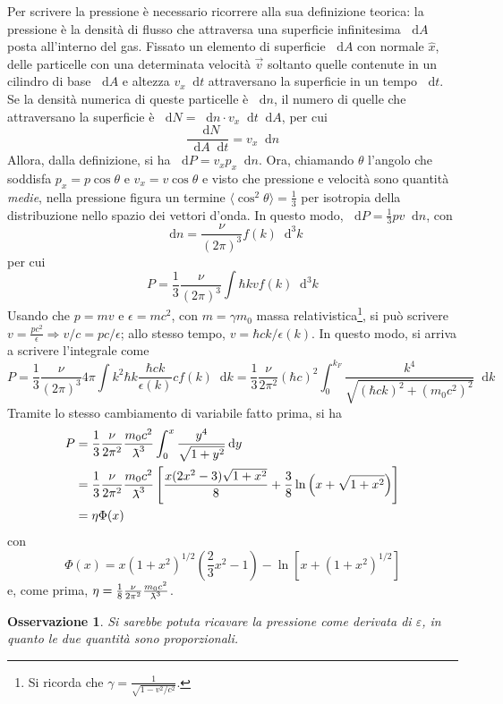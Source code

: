 \documentclass[11pt, a4paper]{scrartcl}
\theoremstyle{style}
\newtheorem{osservazione}{Osservazione}[section]
\newcommand{\dd}{\mathop{}\!\mathrm{d}}
\numberwithin{equation}{subsection}
\newcommand{\lbar}{{\mkern0.75mu\mathchar '26\mkern -9.75mu\lambda}}
\begin{document}
\noindent Per scrivere la pressione \`e necessario ricorrere alla sua definizione teorica: la pressione \`e la densit\`a di flusso che attraversa una superficie infinitesima $\dd A$ posta all'interno del gas.
Fissato un elemento di superficie $\dd A$ con normale $\hat{x}$, delle particelle con una determinata velocit\`a $\vec{v}$ soltanto quelle contenute in un cilindro di base $\dd A$ e altezza $v_x\dd t$ attraversano la superficie in un tempo $\dd t$.
Se la densit\`a numerica di queste particelle \`e $\dd n$, il numero di quelle che attraversano la superficie \`e $\dd N = \dd n \cdot v_x\dd t \dd A$, per cui
\[
\frac{\dd  N}{\dd A \dd t} = v_x \dd n
\] 
Allora, dalla definizione, si ha $\dd P = v_x p_x \dd n$.
Ora, chiamando $\theta $ l'angolo che soddisfa $p_x = p \cos \theta $ e $v_x = v \cos \theta $ e visto che pressione e velocit\`a sono quantit\`a \textit{medie}, nella pressione figura un termine $\langle \cos^2 \theta  \rangle = \frac{1}{3}$ per isotropia della distribuzione nello spazio dei vettori d'onda.
In questo modo, $\dd P =\frac{1}{3} pv \dd n$, con
\[
\dd n = \frac{\nu }{(2\pi)^3}f(k)\dd ^3k
\] 
per cui
\[
P = \frac{1}{3} \frac{\nu }{(2\pi)^3} \int \hbar k v f(k) \dd ^3 k
\] 
Usando che $p = m v$ e $\epsilon = mc^2$, con $m = \gamma m_0$ massa relativistica\footnote{Si ricorda che $\gamma = \frac{1}{\sqrt{1 - v^2 / c^2} }$.}, si pu\`o scrivere $v = \frac{pc^2}{\epsilon }\Rightarrow v / c = p c / \epsilon $; allo stesso tempo, $v = \hbar  c k / \epsilon (k)$.
In questo modo, si arriva a scrivere l'integrale come
\[
P = \frac{1}{3} \frac{\nu }{(2\pi)^3} 4\pi \int k^2 \hbar k \frac{\hbar c k }{\epsilon (k)} c f(k) \dd k=\frac{1}{3}\frac{\nu }{2\pi^2} (\hbar c)^2 \int _0^{k_F} \frac{k^4}{\sqrt{(\hbar ck)^2 + (m_0c^2)^2} }  \dd k
\] 
Tramite lo stesso cambiamento di variabile fatto prima, si ha
\[
	\begin{split}
		P &= \frac{1}{3} \frac{\nu }{2\pi^2} \frac{m_0c^2}{\lbar^3} \int _0^x \frac{y^4}{\sqrt{1+y^2} } \dd y \\
		  &= \frac{1}{3} \frac{\nu }{2\pi^2} \frac{m_0c^2}{\lbar^3} \left[ \frac{x(2x^2-3)\sqrt{1+x^2}}{8} + \frac{3}{8}\ln\left(x+\sqrt{1+x^2}\right) \right]  \\
		  &= \eta \Phi (x)
	\end{split}
\] 
con 
\[
\Phi (x) = x \left(1 + x^2\right) ^{1 / 2}  \left(\frac{2}{3}x^2 - 1\right)  - \ln \left[ x + \left(1+x^2\right) ^{1 / 2} \right] 
\] 
e, come prima, $\eta = \frac{1}{8}\frac{\nu }{2\pi^2} \frac{m_0 c^2}{\lbar^3}$.
\begin{osservazione}
Si sarebbe potuta ricavare la pressione come derivata di $\varepsilon $, in quanto le due quantit\`a sono proporzionali.
\end{osservazione}
\end{document}
